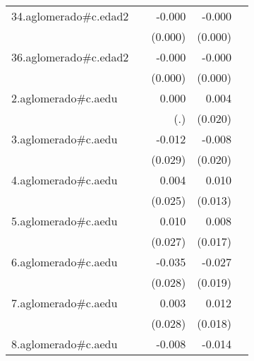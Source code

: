 {\begin{longtable}{l*{4}{D{.}{.}{-1}}}
\addlinespace
34.aglomerado#c.edad2&                     &      -0.000         &      -0.000\sym{***}&                     \\
            &                     &     (0.000)         &     (0.000)         &                     \\
\addlinespace
36.aglomerado#c.edad2&                     &      -0.000         &      -0.000\sym{**} &                     \\
            &                     &     (0.000)         &     (0.000)         &                     \\
\addlinespace
2.aglomerado#c.aedu&                     &       0.000         &       0.004         &                     \\
            &                     &         (.)         &     (0.020)         &                     \\
\addlinespace
3.aglomerado#c.aedu&                     &      -0.012         &      -0.008         &                     \\
            &                     &     (0.029)         &     (0.020)         &                     \\
\addlinespace
4.aglomerado#c.aedu&                     &       0.004         &       0.010         &                     \\
            &                     &     (0.025)         &     (0.013)         &                     \\
\addlinespace
5.aglomerado#c.aedu&                     &       0.010         &       0.008         &                     \\
            &                     &     (0.027)         &     (0.017)         &                     \\
\addlinespace
6.aglomerado#c.aedu&                     &      -0.035         &      -0.027         &                     \\
            &                     &     (0.028)         &     (0.019)         &                     \\
\addlinespace
7.aglomerado#c.aedu&                     &       0.003         &       0.012         &                     \\
            &                     &     (0.028)         &     (0.018)         &                     \\
\addlinespace
8.aglomerado#c.aedu&                     &      -0.008         &      -0.014         &                     \\

\end{longtable}}

